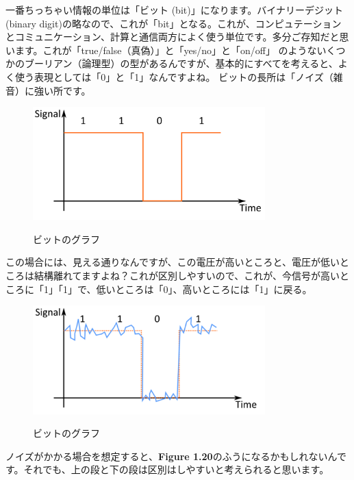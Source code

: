 一番ちっちゃい情報の単位は「ビット (bit)」になります。バイナリーデジット (binary digit)の略なので、これが「bit」となる。これが、コンピュテーションとコミュニケーション、計算と通信両方によく使う単位です。多分ご存知だと思います。これが「true/false（真偽）」と「yes/no」と「on/off」
のようないくつかのブーリアン（論理型）の型があるんですが、基本的にすべてを考えると、よく使う表現としては「0」と「1」なんですよね。
ビットの長所は「ノイズ（雑音）に強い所です。
\begin{figure}[H]
    \centering
    \includegraphics[width=0.8\textwidth]{lesson1/presence_abscence_bit.pdf}
    \label{fig: 1}
    \begin{center}
        \caption{ビットのグラフ}
    \end{center}
\end{figure}
この場合には、見える通りなんですが、この電圧が高いところと、電圧が低いところは結構離れてますよね？これが区別しやすいので、これが、今信号が高いところに「1」「1」で、低いところは「0」、高いところには「1」に戻る。
\begin{figure}[H]
    \centering
    \includegraphics[width=0.8\textwidth]{lesson1/presence_abscence_noise.pdf}
    \label{fig: 1}
    \begin{center}
        \caption{ビットのグラフ}
    \end{center}
\end{figure}
ノイズがかかる場合を想定すると、\textbf{Figure 1.20}のふうになるかもしれないんです。それでも、上の段と下の段は区別はしやすいと考えられると思います。
